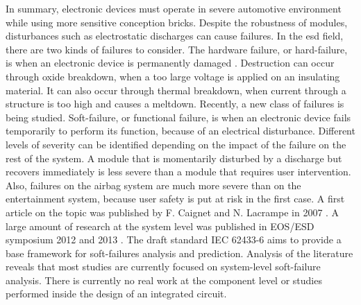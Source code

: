 In summary, electronic devices must operate in severe automotive environment while using more sensitive conception bricks.
Despite the robustness of modules, disturbances such as electrostatic discharges can cause failures.
In the \gls{esd} field, there are two kinds of failures to consider.
The hardware failure, or hard-failure, is when an electronic device is permanently damaged \cite{impactESDsemiconductors}.
Destruction can occur through oxide breakdown, when a too large voltage is applied on an insulating material.
It can also occur through thermal breakdown, when current through a structure is too high and causes a meltdown.
Recently, a new class of failures is being studied.
Soft-failure, or functional failure, is when an electronic device fails temporarily to perform its function, because of an electrical disturbance.
Different levels of severity can be identified depending on the impact of the failure on the rest of the system.
A module that is momentarily disturbed by a discharge but recovers immediately is less severe than a module that requires user intervention.
Also, failures on the airbag system are much more severe than on the entertainment system, because user safety is put at risk in the first case.
A first article on the topic was published by F. Caignet and N. Lacrampe in 2007 \cite{LacrampeTransientImmunity}.
A large amount of research at the system level was published in EOS/ESD symposium 2012 \cite{soft-error-esd-1,SDRAMCase,mixedModeESDSims} and 2013 \cite{softFailSubsystem, powered-tlp-soft-fail}.
The draft standard IEC 62433-6 \cite{iec62433-6} aims to provide a base framework for soft-failures analysis and prediction.
Analysis of the literature reveals that most studies are currently focused on system-level soft-failure analysis.
There is currently no real work at the component level or studies performed inside the design of an integrated circuit.

